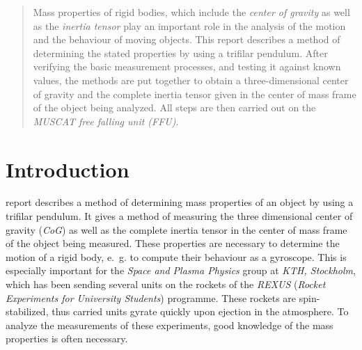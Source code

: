 \documentclass[journal]{IEEEtran}
\begin{document}




\maketitle

\begin{abstract}
	Mass properties of rigid bodies, which include the \emph{center of gravity} as well as the \emph{inertia tensor} play an important role in the analysis of the motion and the behaviour of moving objects.
	This report describes a method of determining the stated properties by using a trifilar pendulum.
	After verifying the basic measurement processes, and testing it against known values, the methods are put together to obtain a three-dimensional center of gravity and the complete inertia tensor given in the center of mass frame of the object being analyzed.
	All steps are then carried out on the \emph{MUSCAT free falling unit (FFU)}.
\end{abstract}







%
\IEEEpeerreviewmaketitle



\section{Introduction}

 report describes a method of determining mass properties of an object by using a trifilar pendulum.
It gives a method of measuring the three dimensional center of gravity (\emph{CoG}) as well as the complete inertia tensor in the center of mass frame of the object being measured.
These properties are necessary to determine the motion of a rigid body, e.~g. to compute their behaviour as a gyroscope.
This is especially important for the \emph{Space and Plasma Physics} group at \emph{KTH, Stockholm}, which has been sending several units on the rockets of the \emph{REXUS} (\emph{Rocket Experiments for University Students}) programme. These rockets are spin-stabilized, thus carried units gyrate quickly upon ejection in the atmosphere.
To analyze the measurements of these experiments, good knowledge of the mass properties is often necessary.
\end{document}
